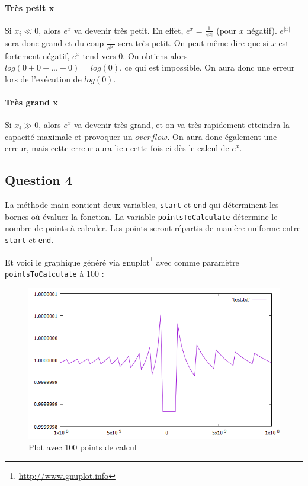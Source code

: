 \paragraph{Très petit x}
Si $x_i \ll 0$, alors $e^x$ va devenir très petit. En effet, $e^{x} = \frac{1}{e^{|x|}}$ (pour $x$ négatif). $e^{|x|}$ sera donc grand et du coup $\frac{1}{e^{|x|}}$ sera très petit. On peut même dire que si $x$ est fortement négatif, $e^x$ tend vers 0. On obtiens alors $log(0+0+...+0) = log(0)$, ce qui est impossible. On aura donc une erreur lors de l'exécution de $log(0)$.

\paragraph{Très grand x}
Si $x_i \gg 0$, alors $e^x$ va devenir très grand, et on va très rapidement etteindra la capacité maximale et provoquer un $overflow$. On aura donc également une erreur, mais cette erreur aura lieu cette fois-ci dès le calcul de $e^x$.

\subsection{Question 4}

La méthode main contient deux variables, \texttt{start} et \texttt{end} qui déterminent les bornes où évaluer la fonction. La variable \texttt{pointsToCalculate} détermine le nombre de points à calculer. Les points seront répartis de manière uniforme entre \texttt{start} et \texttt{end}.


Et voici le graphique généré via gnuplot\footnote{\url{http://www.gnuplot.info}} avec comme paramètre \texttt{pointsToCalculate} à 100 :

\begin{figure}[H]
	\caption{\label{ex} Plot avec 100 points de calcul}
	\centering
	\includegraphics[scale = 0.55]{1_plot.png}
\end{figure}
